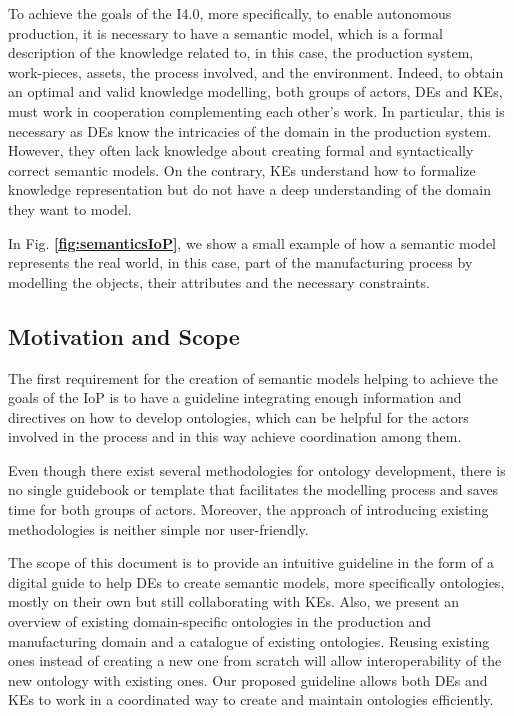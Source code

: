 \documentclass{guideline/sty/rapport}
\begin{document}
To achieve the goals of the \ac{I4.0}, more specifically, to enable autonomous production, it is necessary to have a semantic model, which is a formal description of the knowledge related to, in this case, the production system, work-pieces, assets, the process involved, and the environment. Indeed, to obtain an optimal and valid knowledge modelling, both groups of actors, \ac{DEs} and \ac{KEs}, must work in cooperation complementing each other's work. In particular, this is necessary as \ac{DEs} know the intricacies of the domain in the production system. However, they often lack knowledge about creating formal and syntactically correct semantic models. On the contrary, \ac{KEs} understand how to formalize knowledge representation but do not have a deep understanding of the domain they want to model.\singlespacing

In Fig. \textbf{\ref{fig:semanticsIoP}}, we show a small example of how a semantic model represents the real world, in this case, part of the manufacturing process by modelling the objects, their attributes and the necessary constraints.

\subsection{Motivation and Scope}

The first requirement for the creation of semantic models helping to achieve the goals of the \ac{IoP} is to have a guideline integrating enough information and directives on how to develop ontologies, which can be helpful for the actors involved in the process and in this way achieve coordination among them. \singlespacing

Even though there exist several methodologies for ontology development, there is no single guidebook or template that facilitates the modelling process and saves time for both groups of actors. Moreover, the approach of introducing existing methodologies is neither simple nor user-friendly.\singlespacing

The scope of this document is to provide an intuitive guideline in the form of a digital guide to help \ac{DEs} to create semantic models, more specifically ontologies, mostly on their own but still collaborating with \ac{KEs}. Also, we present an overview of existing domain-specific ontologies in the production and manufacturing domain and a catalogue of existing ontologies. Reusing existing ones instead of creating a new one from scratch will allow interoperability of the new ontology with existing ones. Our proposed guideline allows both \ac{DEs} and \ac{KEs} to work in a coordinated way to create and maintain ontologies efficiently.\singlespacing
\end{document}
